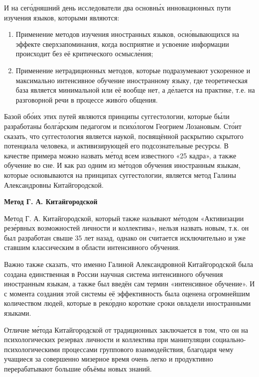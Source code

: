 И на сег\'{о}дняшний день исследователи  два основн\'{ы}х инновационных пути изучения языков, которыми являются:
\begin{enumerate}
    \item Применение методов изучения иностранных языков, осн\'{о}вывающихся на эффекте сверхзапоминания, когда восприятие и усвоение информации происходит без её критического осмысл\'{е}ния;
    \item Применение нетрадиционных методов, которые подразумевают ускоренное и максимально интенсивное обучение иностранному языку, где теоретическая база является минимальной или её вообще нет, а  д\'{е}лается на практике, т.е. на разговорной речи в процессе жив\'{о}го общения.
\end{enumerate}

Базой об\'{о}их этих путей являются принципы суггестологии, которые б\'{ы}ли разработаны болг\'{а}рским педагогом и псих\'{о}логом Геогрием Лозановым. Ст\'{о}ит сказать, что суггестология является наукой, посвящённой раскрытию скрытого потенциала человека, и активизирующей его подсознательные ресурсы. В качестве примера можно назвать м\'{е}тод всем известного «25 кадра», а также обучение во сне. И как раз одним из м\'{е}тодов обучения иностранным языкам, которые основываются на принципах суггестологии, является метод Галины Александровны Китайгородской.

\textbf{Метод Г. А. Китайгородской}

Метод Г. А. Китайгородской, который также называют м\'{е}тодом «Активизации рез\'{е}рвных возможностей личности и коллектива», нельзя назвать новым, т.к. он был разработан свыше 35 лет назад, однако он считается исключительно  и уже ставшим классическим в области интенсивного обучения.

Важно также сказать, что именно Галиной Александровной Китайгородской была создана единственная в России научная система интенсивного обучения иностранным языкам, а также был введён сам термин «интенсивное обучение». И с момента создания этой системы её эффективность была оценена огромнейшим количеством людей, которые в рек\'{о}рдно короткие сроки овладели иностранными языками.

Отличие м\'{е}тода Китайгородской от традиционных заключается в том, что он  на психологических резервах личности и коллектива при  манипуляции социально-психологическими процессами  группового взаимодействия, благодаря чему учащиеся за совершенно мизерное время очень легко и продуктивно перерабатывают большие объёмы новых знаний.

